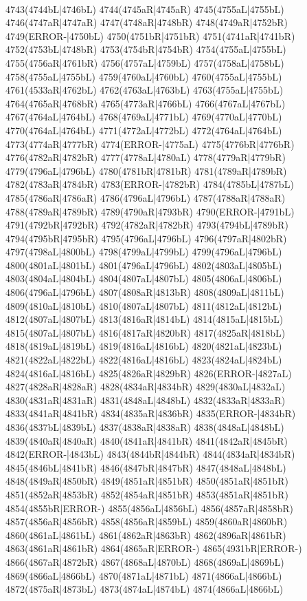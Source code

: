 \\4743(4744bL|4746bL) 4744(4745aR|4745aR) 4745(4755aL|4755bL) 4746(4747aR|4747aR) 4747(4748aR|4748bR) 4748(4749aR|4752bR) 4749(ERROR-|4750bL) 4750(4751bR|4751bR) 4751(4741aR|4741bR) \\4752(4753bL|4748bR) 4753(4754bR|4754bR) 4754(4755aL|4755bL) 4755(4756aR|4761bR) 4756(4757aL|4759bL) 4757(4758aL|4758bL) 4758(4755aL|4755bL) 4759(4760aL|4760bL) 4760(4755aL|4755bL) \\4761(4533aR|4762bL) 4762(4763aL|4763bL) 4763(4755aL|4755bL) 4764(4765aR|4768bR) 4765(4773aR|4766bL) 4766(4767aL|4767bL) 4767(4764aL|4764bL) 4768(4769aL|4771bL) 4769(4770aL|4770bL) \\4770(4764aL|4764bL) 4771(4772aL|4772bL) 4772(4764aL|4764bL) 4773(4774aR|4777bR) 4774(ERROR-|4775aL) 4775(4776bR|4776bR) 4776(4782aR|4782bR) 4777(4778aL|4780aL) 4778(4779aR|4779bR) \\4779(4796aL|4796bL) 4780(4781bR|4781bR) 4781(4789aR|4789bR) 4782(4783aR|4784bR) 4783(ERROR-|4782bR) 4784(4785bL|4787bL) 4785(4786aR|4786aR) 4786(4796aL|4796bL) 4787(4788aR|4788aR) \\4788(4789aR|4789bR) 4789(4790aR|4793bR) 4790(ERROR-|4791bL) 4791(4792bR|4792bR) 4792(4782aR|4782bR) 4793(4794bL|4789bR) 4794(4795bR|4795bR) 4795(4796aL|4796bL) 4796(4797aR|4802bR) \\4797(4798aL|4800bL) 4798(4799aL|4799bL) 4799(4796aL|4796bL) 4800(4801aL|4801bL) 4801(4796aL|4796bL) 4802(4803aL|4805bL) 4803(4804aL|4804bL) 4804(4807aL|4807bL) 4805(4806aL|4806bL) \\4806(4796aL|4796bL) 4807(4808aR|4813bR) 4808(4809aL|4811bL) 4809(4810aL|4810bL) 4810(4807aL|4807bL) 4811(4812aL|4812bL) 4812(4807aL|4807bL) 4813(4816aR|4814bL) 4814(4815aL|4815bL) \\4815(4807aL|4807bL) 4816(4817aR|4820bR) 4817(4825aR|4818bL) 4818(4819aL|4819bL) 4819(4816aL|4816bL) 4820(4821aL|4823bL) 4821(4822aL|4822bL) 4822(4816aL|4816bL) 4823(4824aL|4824bL) \\4824(4816aL|4816bL) 4825(4826aR|4829bR) 4826(ERROR-|4827aL) 4827(4828aR|4828aR) 4828(4834aR|4834bR) 4829(4830aL|4832aL) 4830(4831aR|4831aR) 4831(4848aL|4848bL) 4832(4833aR|4833aR) \\4833(4841aR|4841bR) 4834(4835aR|4836bR) 4835(ERROR-|4834bR) 4836(4837bL|4839bL) 4837(4838aR|4838aR) 4838(4848aL|4848bL) 4839(4840aR|4840aR) 4840(4841aR|4841bR) 4841(4842aR|4845bR) \\4842(ERROR-|4843bL) 4843(4844bR|4844bR) 4844(4834aR|4834bR) 4845(4846bL|4841bR) 4846(4847bR|4847bR) 4847(4848aL|4848bL) 4848(4849aR|4850bR) 4849(4851aR|4851bR) 4850(4851aR|4851bR) \\4851(4852aR|4853bR) 4852(4854aR|4851bR) 4853(4851aR|4851bR) 4854(4855bR|ERROR-) 4855(4856aL|4856bL) 4856(4857aR|4858bR) 4857(4856aR|4856bR) 4858(4856aR|4859bL) 4859(4860aR|4860bR) \\4860(4861aL|4861bL) 4861(4862aR|4863bR) 4862(4896aR|4861bR) 4863(4861aR|4861bR) 4864(4865aR|ERROR-) 4865(4931bR|ERROR-) 4866(4867aR|4872bR) 4867(4868aL|4870bL) 4868(4869aL|4869bL) \\4869(4866aL|4866bL) 4870(4871aL|4871bL) 4871(4866aL|4866bL) 4872(4875aR|4873bL) 4873(4874aL|4874bL) 4874(4866aL|4866bL) 